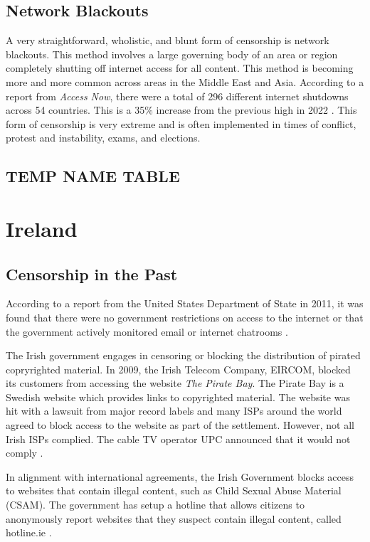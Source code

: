 \subsection{Network Blackouts}

A very straightforward, wholistic, and blunt form of censorship is network blackouts. This method involves a large governing body of an area or region completely shutting off internet access for all content. This method is becoming more and more common across areas in the Middle East and Asia. According to a report from \textit{Access Now}, there were a total of 296 different internet shutdowns across 54 countries. This is a 35\% increase from the previous high in 2022 \cite{inetenetBlackouts}. This form of censorship is very extreme and is often implemented in times of conflict, protest and instability, exams, and elections. 

\subsection{TEMP NAME TABLE}

\section{Ireland}

\subsection{Censorship in the Past}

According to a report from the United States Department of State in 2011, it was found that there were no government restrictions on access to the internet or that the government actively monitored email or internet chatrooms \cite{stateTechnicalDifficulties}.

The Irish government engages in censoring or blocking the distribution of pirated copryrighted material. In 2009, the Irish Telecom Company, EIRCOM, blocked its customers from accessing the website \textit{The Pirate Bay}. The Pirate Bay is a Swedish website which provides links to copyrighted material. The website was hit with a lawsuit from major record labels and many ISPs around the world agreed to block access to the website as part of the settlement. However, not all Irish ISPs complied. The cable TV operator UPC announced that it would not comply \cite{irishtimesEircomBlock}. 

In alignment with international agreements, the Irish Government blocks access to websites that contain illegal content, such as Child Sexual Abuse Material (CSAM). The government has setup a hotline that allows citizens to anonymously report websites that they suspect contain illegal content, called hotline.ie \cite{hotlineAboutx2013}.

